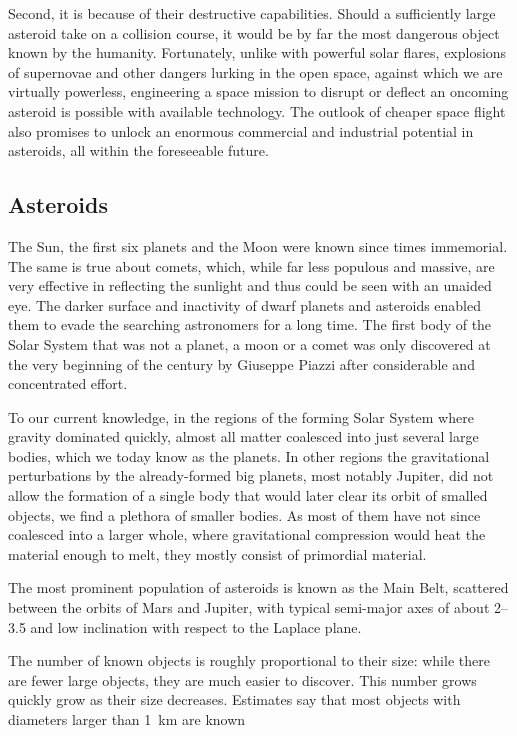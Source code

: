     Second, it is because of their destructive capabilities.
    Should a sufficiently large asteroid take on a collision course, it would be by far the most dangerous object
    known by the humanity. Fortunately, unlike with powerful solar flares, explosions of supernovae and other
    dangers lurking in the open space, against which we are virtually powerless,
    engineering a space mission to disrupt or deflect an oncoming asteroid is possible with available technology.
    The outlook of cheaper space flight also promises to unlock an enormous commercial and industrial potential in asteroids,
    all within the foreseeable future.

    \subsection{Asteroids} \label{iaa}
        The Sun, the first six planets and the Moon were known since times immemorial.
        The same is true about comets, which, while far less populous and massive,
        are very effective in reflecting the sunlight and thus could be seen with an unaided eye.
        The darker surface and inactivity of dwarf planets and asteroids enabled them
        to evade the searching astronomers for a long time.
        The first body of the Solar System that was not a planet, a moon or a comet was only discovered at
        the very beginning of the  century by Giuseppe Piazzi after considerable and concentrated effort.

        To our current knowledge, in the regions of the forming Solar System where gravity dominated quickly,
        almost all matter coalesced into just several large bodies, which we today know as the planets.
        In other regions the gravitational perturbations by the already-formed big planets, most notably Jupiter,
        did not allow the formation of a single body that would later clear its orbit of smalled objects,
        we find a plethora of smaller bodies. As most of them have not since coalesced into a larger whole,
        where gravitational compression would heat the material enough to melt, they mostly consist of primordial material.

        The most prominent population of asteroids is known as the Main Belt, scattered between the orbits
        of Mars and Jupiter, with typical semi-major axes of about \SIrange{2}{3.5}{\au} and low inclination
        with respect to the Laplace plane.

        The number of known objects is roughly proportional to their size: while there are fewer large objects,
        they are much easier to discover. This number grows quickly grow as their size decreases.
        Estimates say that most objects with diameters larger than \SI{1}{\kilo\metre} are known

